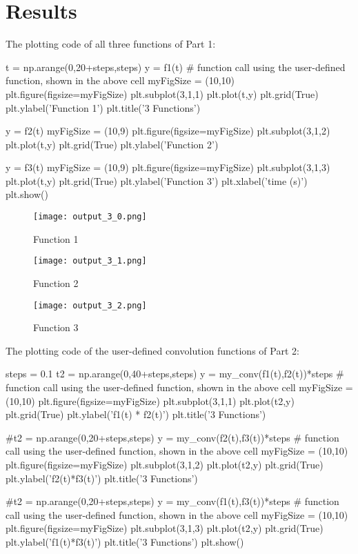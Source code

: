 \documentclass[12pt]{article}
\begin{document}
\section{Results}
The plotting code  of all three functions of Part 1:
\begin{python}
t = np.arange(0,20+steps,steps)
y = f1(t) # function call using the user-defined function, shown in the above cell
myFigSize = (10,10)
plt.figure(figsize=myFigSize)
plt.subplot(3,1,1)
plt.plot(t,y)
plt.grid(True)
plt.ylabel('Function 1')
plt.title('3 Functions')

y = f2(t)
myFigSize = (10,9)
plt.figure(figsize=myFigSize)
plt.subplot(3,1,2)
plt.plot(t,y)
plt.grid(True)
plt.ylabel('Function 2')

y = f3(t)
myFigSize = (10,9)
plt.figure(figsize=myFigSize)
plt.subplot(3,1,3)
plt.plot(t,y)
plt.grid(True)
plt.ylabel('Function 3')
plt.xlabel('time (s)')
plt.show()
\end{python}
\begin{figure}[H]
\texttt{[image: output\_3\_0.png]}
  \caption{Function 1}
  \end{figure}
\begin{figure}[H]
\texttt{[image: output\_3\_1.png]}
  \caption{Function 2}
  \end{figure}
  \begin{figure}[H]
\texttt{[image: output\_3\_2.png]}
  \caption{Function 3}
  \end{figure}
The plotting code of the user-defined convolution functions of Part 2:
\begin{python}
steps = 0.1
t2 = np.arange(0,40+steps,steps)
y = my_conv(f1(t),f2(t))*steps # function call using the user-defined function, shown in the above cell
myFigSize = (10,10)
plt.figure(figsize=myFigSize)
plt.subplot(3,1,1)
plt.plot(t2,y)
plt.grid(True)
plt.ylabel('f1(t) * f2(t)')
plt.title('3 Functions')

#t2 = np.arange(0,20+steps,steps)
y = my_conv(f2(t),f3(t))*steps # function call using the user-defined function, shown in the above cell
myFigSize = (10,10)
plt.figure(figsize=myFigSize)
plt.subplot(3,1,2)
plt.plot(t2,y)
plt.grid(True)
plt.ylabel('f2(t)*f3(t)')
plt.title('3 Functions')

#t2 = np.arange(0,20+steps,steps)
y = my_conv(f1(t),f3(t))*steps # function call using the user-defined function, shown in the above cell
myFigSize = (10,10)
plt.figure(figsize=myFigSize)
plt.subplot(3,1,3)
plt.plot(t2,y)
plt.grid(True)
plt.ylabel('f1(t)*f3(t)')
plt.title('3 Functions')
plt.show()
\end{python}
\end{document}
